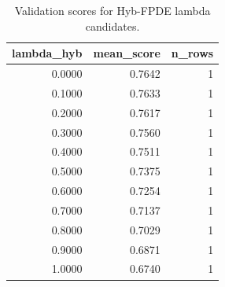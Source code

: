 \begin{table}[t]
\caption{Validation scores for Hyb-FPDE lambda candidates.}
\label{tab:lambda_distribution_computed}
\centering
\begin{tabular}{rrr}
\toprule
lambda\_hyb & mean\_score & n\_rows \\
\midrule
0.0000 & 0.7642 & 1 \\
0.1000 & 0.7633 & 1 \\
0.2000 & 0.7617 & 1 \\
0.3000 & 0.7560 & 1 \\
0.4000 & 0.7511 & 1 \\
0.5000 & 0.7375 & 1 \\
0.6000 & 0.7254 & 1 \\
0.7000 & 0.7137 & 1 \\
0.8000 & 0.7029 & 1 \\
0.9000 & 0.6871 & 1 \\
1.0000 & 0.6740 & 1 \\
\bottomrule
\end{tabular}

\end{table}

